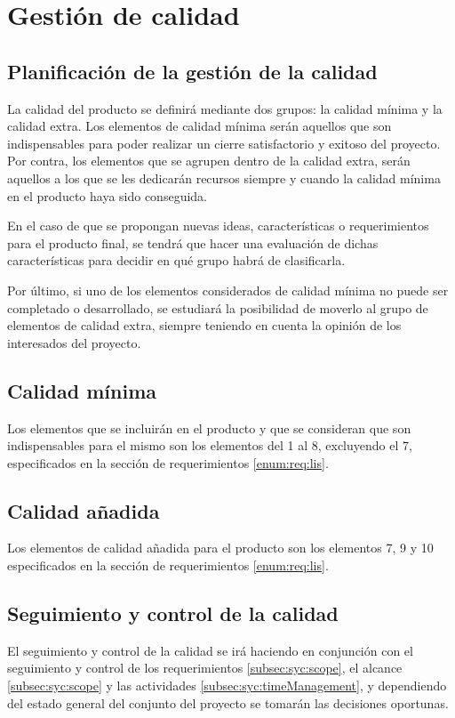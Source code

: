 \section{Gestión de calidad}
\subsection{Planificación de la gestión de la calidad}
La calidad del producto se definirá mediante dos grupos: la calidad
mínima y la calidad extra. Los elementos de calidad mínima serán
aquellos que son indispensables para poder realizar un cierre
satisfactorio y exitoso del proyecto. Por contra, los elementos que se
agrupen dentro de la calidad extra, serán aquellos a los que se les
dedicarán recursos siempre y cuando la calidad mínima en el producto
haya sido conseguida.

En el caso de que se propongan nuevas ideas, características o
requerimientos para el producto final, se tendrá que hacer una
evaluación de dichas características para decidir en qué grupo habrá de
clasificarla.

Por último, si uno de los elementos considerados de calidad mínima no
puede ser completado o desarrollado, se estudiará la posibilidad de
moverlo al grupo de elementos de calidad extra, siempre teniendo en
cuenta la opinión de los interesados del proyecto.

\subsection{Calidad mínima}
Los elementos que se incluirán en el producto y que se consideran que
son indispensables para el mismo son los elementos del 1 al 8,
excluyendo el 7, especificados en la sección de requerimientos
\ref{enum:req:lis}.

\subsection{Calidad añadida}
Los elementos de calidad añadida para el producto son los elementos 7,
9 y 10 especificados en la sección de requerimientos \ref{enum:req:lis}.

\subsection{Seguimiento y control de la calidad}
El seguimiento y control de la calidad se irá haciendo en conjunción con
el seguimiento y control de los requerimientos \ref{subsec:syc:scope},
el alcance \ref{subsec:syc:scope} y las actividades
\ref{subsec:syc:timeManagement}, y dependiendo del estado general del
conjunto del proyecto se tomarán las decisiones oportunas.
